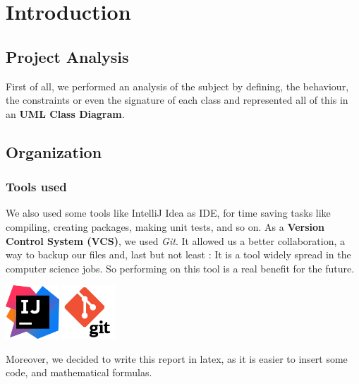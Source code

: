 \documentclass[english, 11pt, titlepage]{article}
\begin{document}
    

    \pagebreak
    \tableofcontents

    \pagebreak
    \section{Introduction}
    \subsection{Project Analysis}
    First of all, we performed an analysis of the subject by defining, the behaviour, the constraints or even the signature of each class and represented all of this in an \textbf{UML Class Diagram}.
    \subsection{Organization}
    \subsubsection{Tools used}
    We also used some tools like IntelliJ Idea as IDE, for time saving tasks like compiling, creating packages, making unit tests, and so on. As a \textbf{Version Control System (VCS)}, we used \emph{Git}. It allowed us a better collaboration, a way to backup our files and, last but not least : It is a tool widely spread in the computer science jobs. So performing on this tool is a real benefit for the future.
    \begin{center}
        \includegraphics[width=2cm]{IntelliJ_IDEA_Icon.svg.png}
        \hspace{2cm}
        \includegraphics[width=2cm]{git.png}
    \end{center}

    Moreover, we decided to write this report in latex, as it is easier to insert some code, and mathematical formulas.
\end{document}
